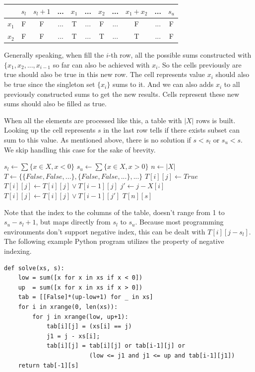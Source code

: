 \documentclass[UTF8]{article}
\begin{document}
\begin{tabular}{|c|c|c|c|c|c|c|c|c|c|c|}
\hline
 & $s_l$ & $s_l+1$ & ... & $x_1$ & ... & $x_2$ & ... & $x_1 + x_2$ & ... & $s_u$ \\
\hline
$x_1$ & F & F & ... & T & ... & F & ... & F & ... & F \\
\hline
$x_2$ & F & F & ... & T & ... & T & ... & T & ... & F \\
\hline
\end{tabular}

Generally speaking, when fill the $i$-th row, all the possible sums
constructed with $\{x_1, x_2, ..., x_{i-1}$ so far
can also be achieved with $x_i$. So the cells previously are true
should also be true in this new row. The cell represents value $x_i$
should also be true since the singleton set $\{x_i\}$ sums to it.
And we can also adds $x_i$ to all previously constructed sums to
get the new results. Cells represent these new sums should also
be filled as true.

When all the elements are processed like this, a table with $|X|$
rows is built. Looking up the cell represents $s$ in the last row
tells if there exists subset can sum to this value. As mentioned
above, there
is no solution if $s < s_l$ or $s_u < s$. We skip handling this
case for the sake of brevity.

\begin{algorithmic}[1]
  \State $s_l \gets \sum \{x \in X, x < 0\}$
  \State $s_u \gets \sum \{x \in X, x > 0\}$
  \State $n \gets |X|$
  \State $T \gets \{\{False, False, ...\}, \{False, False, ...\}, ...\}$ 
        \State $T[i][j] \gets True$
      \EndIf
        \State $T[i][j] \gets T[i][j] \lor T[i-1][j]$
        \State $j' \gets j - X[i]$
          \State $T[i][j] \gets T[i][j] \lor T[i-1][j']$
        \EndIf
      \EndIf
    \EndFor
  \EndFor
  \State \Return $T[n][s]$
\EndFunction
\end{algorithmic}

Note that the index to the columns of the table, doesn't range from 1 to $s_u-s_l + 1$,
but maps directly from $s_l$ to $s_u$. Because most programming environments don't support
negative index, this can be dealt with $T[i][j-s_l]$. The following example
Python program utilizes the property of negative indexing.

\lstset{language=Python}
\begin{lstlisting}
def solve(xs, s):
    low = sum([x for x in xs if x < 0])
    up  = sum([x for x in xs if x > 0])
    tab = [[False]*(up-low+1) for _ in xs]
    for i in xrange(0, len(xs)):
        for j in xrange(low, up+1):
            tab[i][j] = (xs[i] == j)
            j1 = j - xs[i];
            tab[i][j] = tab[i][j] or tab[i-1][j] or
                        (low <= j1 and j1 <= up and tab[i-1][j1])
    return tab[-1][s]
\end{lstlisting}
\end{document}
